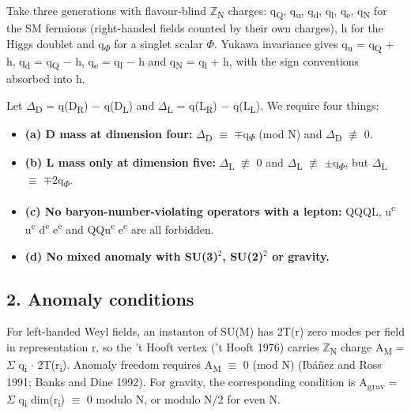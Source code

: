 \documentclass[
  11pt,
]{article}
\providecommand{\tightlist}{%
  \setlength{\itemsep}{0pt}\setlength{\parskip}{0pt}}
\begin{document}
Take three generations with flavour-blind \ensuremath{\mathbb{Z}}\textsubscript{N} charges: q\textsubscript{Q}, q\textsubscript{u}, q\textsubscript{d}, q\textsubscript{l}, q\textsubscript{e}, q\textsubscript{N} for the SM fermions (right-handed fields counted by their own charges), h for the Higgs doublet and q\textsubscript{\ensuremath{\Phi}} for a singlet scalar \ensuremath{\Phi}. Yukawa invariance gives q\textsubscript{u} = q\textsubscript{Q} + h, q\textsubscript{d} = q\textsubscript{Q} \ensuremath{-} h, q\textsubscript{e} = q\textsubscript{l} \ensuremath{-} h and q\textsubscript{N} = q\textsubscript{l} + h, with the sign conventions absorbed into h.

Let \ensuremath{\Delta}\textsubscript{D} = q(D\textsubscript{R}) \ensuremath{-} q(D\textsubscript{L}) and \ensuremath{\Delta}\textsubscript{L} = q(L\textsubscript{R}) \ensuremath{-} q(L\textsubscript{L}). We require four things:

\begin{itemize}
\tightlist
\item
  \textbf{(a) D mass at dimension four:} \ensuremath{\Delta}\textsubscript{D} \ensuremath{\equiv} \ensuremath{\mp}q\textsubscript{\ensuremath{\Phi}} (mod N) and \ensuremath{\Delta}\textsubscript{D} \ensuremath{\not\equiv} 0.
\item
  \textbf{(b) L mass only at dimension five:} \ensuremath{\Delta}\textsubscript{L} \ensuremath{\not\equiv} 0 and \ensuremath{\Delta}\textsubscript{L} \ensuremath{\not\equiv} \ensuremath{\pm}q\textsubscript{\ensuremath{\Phi}}, but \ensuremath{\Delta}\textsubscript{L} \ensuremath{\equiv} \ensuremath{\mp}2q\textsubscript{\ensuremath{\Phi}}.
\item
  \textbf{(c) No baryon-number-violating operators with a lepton:} QQQL, u\textsuperscript{c} u\textsuperscript{c} d\textsuperscript{c} e\textsuperscript{c} and QQu\textsuperscript{c} e\textsuperscript{c} are all forbidden.
\item
  \textbf{(d) No mixed anomaly with SU(3)\ensuremath{^{2}}, SU(2)\ensuremath{^{2}} or gravity.}
\end{itemize}

\hypertarget{anomaly-conditions}{%
\subsection{2. Anomaly conditions}\label{anomaly-conditions}}

For left-handed Weyl fields, an instanton of SU(M) has 2T(r) zero modes per field in representation r, so the 't Hooft vertex ('t Hooft 1976) carries \ensuremath{\mathbb{Z}}\textsubscript{N} charge A\textsubscript{M} = \ensuremath{\Sigma} q\textsubscript{i} \ensuremath{\cdot} 2T(r\textsubscript{i}). Anomaly freedom requires A\textsubscript{M} \ensuremath{\equiv} 0 (mod N) (Ibáñez and Ross 1991; Banks and Dine 1992). For gravity, the corresponding condition is A\textsubscript{grav} = \ensuremath{\Sigma} q\textsubscript{i} dim(r\textsubscript{i}) \ensuremath{\equiv} 0 modulo N, or modulo N/2 for even N.
\end{document}
